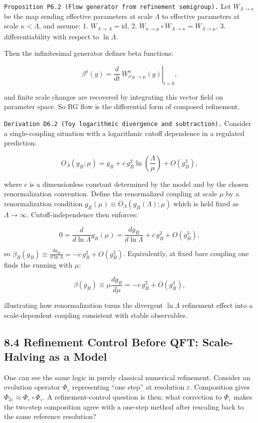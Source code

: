 \documentclass[
]{article}
\begin{document}
\texttt{Proposition\ P6.2\ (Flow\ generator\ from\ refinement\ semigroup).}
Let \(W_{\Lambda\to\kappa}\) be the map sending effective parameters at
scale \(\Lambda\) to effective parameters at scale \(\kappa<\Lambda\),
and assume: 1. \(W_{\Lambda\to\Lambda}=\mathrm{id}\), 2.
\(W_{\kappa\to\mu}\circ W_{\Lambda\to\kappa}=W_{\Lambda\to\mu}\), 3.
differentiability with respect to \(\ln\Lambda\).

Then the infinitesimal generator defines beta functions:

\[
\beta^a(g)
=
\left.\frac{d}{dt}\,W^a_{e^t\mu\to\mu}(g)\right|_{t=0},
\]

and finite scale changes are recovered by integrating this vector field
on parameter space. So RG flow is the differential form of composed
refinement.

\texttt{Derivation\ D6.2\ (Toy\ logarithmic\ divergence\ and\ subtraction).}
Consider a single-coupling situation with a logarithmic cutoff
dependence in a regulated prediction:

\[
O_\Lambda(g_B;\mu)=g_B+c\,g_B^2\ln\!\left(\frac{\Lambda}{\mu}\right)+O(g_B^3),
\]

where \(c\) is a dimensionless constant determined by the model and by
the chosen renormalization convention. Define the renormalized coupling
at scale \(\mu\) by a renormalization condition
\(g_R(\mu)\equiv O_\Lambda(g_B(\Lambda);\mu)\) which is held fixed as
\(\Lambda\to\infty\). Cutoff-independence then enforces:

\[
0=\frac{d}{d\ln\Lambda}g_R(\mu)
=\frac{d g_B}{d\ln\Lambda}+c\,g_B^2+O(g_B^3),
\]

so \(\beta_B(g_B)\equiv \frac{d g_B}{d\ln\Lambda}=-c\,g_B^2+O(g_B^3)\).
Equivalently, at fixed bare coupling one finds the running with \(\mu\):

\[
\beta(g_R)\equiv \mu\frac{d g_R}{d\mu}=-c\,g_R^2+O(g_R^3),
\]

illustrating how renormalization turns the divergent \(\ln\Lambda\)
refinement effect into a scale-dependent coupling consistent with stable
observables.

\hypertarget{refinement-control-before-qft-scale-halving-as-a-model}{%
\subsection{8.4 Refinement Control Before QFT: Scale-Halving as a
Model}\label{refinement-control-before-qft-scale-halving-as-a-model}}

One can see the same logic in purely classical numerical refinement.
Consider an evolution operator \(\Phi_\varepsilon\) representing ``one
step'' at resolution \(\varepsilon\). Composition gives
\(\Phi_{2\varepsilon}\approx \Phi_\varepsilon\circ\Phi_\varepsilon\). A
refinement-control question is then: what correction to
\(\Phi_\varepsilon\) makes the two-step composition agree with a
one-step method after rescaling back to the same reference resolution?
\end{document}
